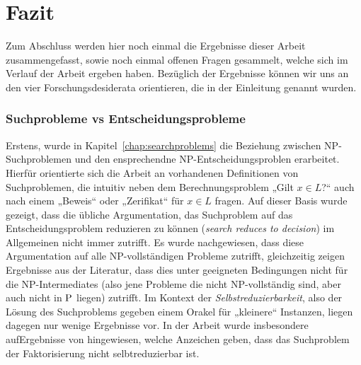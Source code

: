 \chapter{Fazit}\label{chap:conclusion}

Zum Abschluss werden hier noch einmal die Ergebnisse dieser Arbeit zusammengefasst, sowie noch einmal offenen Fragen gesammelt, welche sich im Verlauf der Arbeit ergeben haben.
Bezüglich der Ergebnisse können wir uns an den vier Forschungsdesiderata orientieren, die in der Einleitung genannt wurden.

\subsection*{Suchprobleme vs Entscheidungsprobleme}

Erstens, wurde in Kapitel~\ref{chap:searchproblems} die Beziehung zwischen NP-Suchproblemen und den ensprechendne NP-Entscheidungsproblen erarbeitet.
Hierfür orientierte sich die Arbeit an vorhandenen Definitionen von Suchproblemen, die intuitiv neben dem Berechnungsproblem „Gilt $x\in L$?“ auch nach einem „Beweis“ oder „Zerifikat“ für $x\in L$ fragen. %
Auf dieser Basis wurde gezeigt, dass die übliche Argumentation, das Suchproblem auf das Entscheidungsproblem reduzieren zu können (\emph{search reduces to decision}) im Allgemeinen nicht immer zutrifft. Es wurde nachgewiesen, dass diese Argumentation auf alle NP-vollständigen Probleme zutrifft, gleichzeitig zeigen Ergebnisse aus der Literatur, dass dies unter geeigneten Bedingungen nicht für die NP-Intermediates (also jene Probleme die nicht NP-vollständig sind, aber auch nicht in $\P$ liegen) zutrifft.
Im Kontext der \emph{Selbstreduzierbarkeit}, also der Lösung des Suchproblems gegeben einem Orakel für „kleinere“ Instanzen, liegen dagegen nur wenige Ergebnisse vor. In der Arbeit wurde insbesondere aufErgebnisse von \textcite{harsha_downward_2023} hingewiesen, welche Anzeichen geben, dass das Suchproblem der Faktorisierung nicht selbtreduzierbar ist. 

